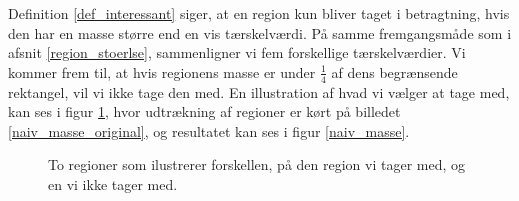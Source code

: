 Definition \ref{def_interessant} siger, at en region kun bliver taget i
betragtning, hvis den har en masse større end en vis tærskelværdi.
På samme fremgangsmåde som i afsnit \ref{region_stoerlse}, sammenligner vi fem
forskellige tærskelværdier. Vi kommer frem til, at hvis regionens masse er
under $\frac{1}{4}$ af dens begrænsende rektangel, vil vi ikke tage den med. En
illustration af hvad vi vælger at tage med, kan ses i figur \ref{masse}, hvor
udtrækning af regioner er kørt på billedet \ref{naiv_masse_original}, og
resultatet kan ses i figur \ref{naiv_masse}.

\begin{figure}[!h]
    \centering
    \hspace{1em}
    \caption{To regioner som ilustrerer forskellen, på den region vi tager med, og en vi ikke tager med.}
	\label{masse}
\end{figure}
